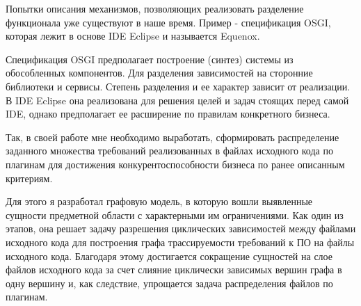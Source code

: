 
Попытки описания механизмов, позволяющих реализовать разделение функционала уже существуют в наше время. Пример - спецификация OSGI, которая лежит в основе IDE Eclipse и называется Equenox.

Спецификация OSGI предполагает построение (синтез) системы из обособленных компонентов. Для разделения зависимостей на сторонние библиотеки и сервисы. Степень разделения и ее характер зависит от реализации. В IDE Eclipse она реализована для решения целей и задач стоящих перед самой IDE, однако предполагает ее расширение по правилам конкретного бизнеса.

Так, в своей работе мне необходимо выработать, сформировать распределение заданного множества требований реализованных в файлах исходного кода по плагинам для достижения конкурентоспособности бизнеса по ранее описанным критериям.

Для этого я разработал графовую модель, в которую вошли выявленные сущности предметной области с характерными им ограничениями. Как один из этапов, она решает задачу разрешения циклических зависимостей между файлами исходного кода для построения графа трассируемости требований к ПО на файлы исходного кода. Благодаря этому достигается сокращение сущностей на слое файлов исходного кода за счет слияние циклически зависимых вершин графа в одну вершину и, как следствие, упрощается задача распределения файлов по плагинам.

